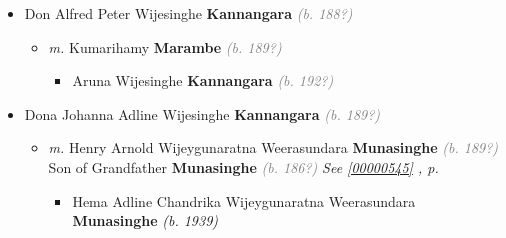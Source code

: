 \documentclass[10pt, openany]{book}
\begin{document}
\begin{itemize}
{\begin{itemize}
{\begin{itemize}
{\begin{itemize}
\item{Amitha Wijesinghe \textbf{Kannangara} \textcolor{gray}{\textit{(b. 191?)}}
\begin{itemize}
\item{\textit{m.} Rohith \textbf{Bandarathileke} \textcolor{gray}{\textit{(b. 191?)}} Son of  Father \textbf{Bandarathileke} \textcolor{gray}{\textit{(b. 187?)}} \textcolor{slteal}{\textit{See  \autoref{00000118} \textit{, p. \pageref{00000118} }}}   \label{couple:00000120:00000383} \begin{itemize}
\item{Marisha \textbf{Bandarathileke} \textcolor{gray}{\textit{(b. 194?)}} \textcolor{slmaroon}{\textit{Entrepreneur (\footnote{\url{https://lk.linkedin.com/in/marisha-bandaratilaka-72b6606}}).}}
 }
\end{itemize}}
\end{itemize}
  }
\end{itemize}}
\end{itemize}
   }
\item{Don Alfred Peter Wijesinghe \textbf{Kannangara} \textcolor{gray}{\textit{(b. 188?)}}
\begin{itemize}
\item{\textit{m.} Kumarihamy \textbf{Marambe} \textcolor{gray}{\textit{(b. 189?)}}   \label{couple:00000395:00000532} \begin{itemize}
\item{Aruna Wijesinghe \textbf{Kannangara} \textcolor{gray}{\textit{(b. 192?)}}
  }
\end{itemize}}
\end{itemize}
    }
\item{Dona Johanna Adline Wijesinghe \textbf{Kannangara} \textcolor{gray}{\textit{(b. 189?)}}
\begin{itemize}
\item{\textit{m.} Henry Arnold Wijeygunaratna Weerasundara \textbf{Munasinghe} \textcolor{gray}{\textit{(b. 189?)}} Son of  Grandfather \textbf{Munasinghe} \textcolor{gray}{\textit{(b. 186?)}} \textcolor{slteal}{\textit{See  \autoref{00000545} \textit{, p. \pageref{00000545} }}}   \label{couple:00000418:00000548} \begin{itemize}
\item{Hema Adline Chandrika Wijeygunaratna Weerasundara \textbf{Munasinghe} \textcolor{slorange}{\textit{(b. 1939)}}
}
\end{itemize}}
\end{itemize}}
\end{itemize}}
\end{itemize}
\end{document}
